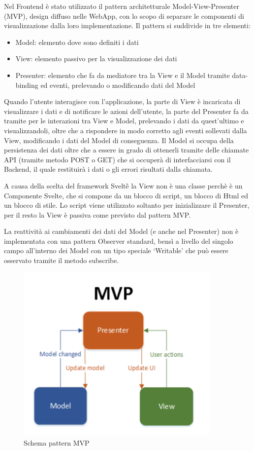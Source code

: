 Nel Frontend è stato utilizzato il pattern architetturale Model-View-Presenter (MVP), design diffuso nelle WebApp, con lo scopo di separare le componenti di
visualizzazione dalla loro implementazione.
Il pattern si suddivide in tre elementi:
\begin{itemize}
    \item Model: elemento dove sono definiti i dati
    \item View: elemento passivo per la visualizzazione dei dati
    \item Presenter: elemento che fa da mediatore tra la View e il Model tramite data-binding ed eventi, prelevando o modificando dati del Model 
\end{itemize}
Quando l'utente interagisce con l'applicazione, la parte di View è incaricata di visualizzare i dati 
e di notificare le azioni dell'utente, la parte del Presenter fa da tramite per le interazioni tra View e Model, prelevando i dati da quest'ultimo e visualizzandoli, 
oltre che a rispondere in modo corretto agli eventi sollevati dalla View, modificando i dati del Model di conseguenza.
Il Model si occupa della persistenza dei dati oltre che a essere in grado di ottenerli tramite delle chiamate API (tramite metodo POST o GET) che si occuperà di interfacciarsi con
il Backend, il quale restituirà i dati o gli errori risultati dalla chiamata. 

A causa della scelta del framework Svelte\G{} la View non è una classe perchè è un Componente Svelte, 
che si compone da un blocco di script, un blocco di Html ed un blocco di stile.
Lo script viene utilizzato soltanto per inizializzare il Presenter, per il resto la View è passiva come previsto dal pattern MVP. 

La reattività ai cambiamenti dei dati del Model (e anche nel Presenter) non è implementata con una pattern Observer standard,
bensì a livello del singolo campo all'interno dei Model con un tipo speciale `Writable' che può essere osservato tramite il metodo subscribe.

\begin{figure}[!h]
    \includegraphics[width=10cm]{sezioni/images/mvp.png}
    \centering
    \caption{Schema pattern MVP}
\end{figure}

